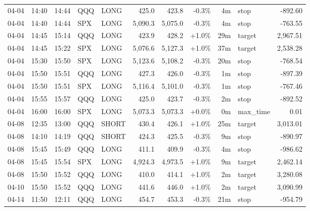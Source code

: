 \documentclass[11pt,a4paper,twoside]{article}
\begin{document}
\begin{center}
\begin{longtable}{>{\color{txtmain}}l l l l l r r r r >{\color{txtmain}}l r}
04-04 & 14:40 & 14:44 & QQQ & LONG & 425.0 & 423.8 & \textcolor{lossred}{-0.3\%} & 4m & stop & \textcolor{lossred}{-892.60} \\
04-04 & 14:40 & 14:44 & SPX & LONG & 5,090.3 & 5,075.0 & \textcolor{lossred}{-0.3\%} & 4m & stop & \textcolor{lossred}{-763.55} \\
04-04 & 14:45 & 15:14 & QQQ & LONG & 423.9 & 428.2 & \textcolor{wingreen}{+1.0\%} & 29m & target & \textcolor{wingreen}{2,967.51} \\
04-04 & 14:45 & 15:22 & SPX & LONG & 5,076.6 & 5,127.3 & \textcolor{wingreen}{+1.0\%} & 37m & target & \textcolor{wingreen}{2,538.28} \\
04-04 & 15:30 & 15:50 & SPX & LONG & 5,123.6 & 5,108.2 & \textcolor{lossred}{-0.3\%} & 20m & stop & \textcolor{lossred}{-768.54} \\
04-04 & 15:50 & 15:51 & QQQ & LONG & 427.3 & 426.0 & \textcolor{lossred}{-0.3\%} & 1m & stop & \textcolor{lossred}{-897.39} \\
04-04 & 15:50 & 15:51 & SPX & LONG & 5,116.4 & 5,101.0 & \textcolor{lossred}{-0.3\%} & 1m & stop & \textcolor{lossred}{-767.46} \\
04-04 & 15:55 & 15:57 & QQQ & LONG & 425.0 & 423.7 & \textcolor{lossred}{-0.3\%} & 2m & stop & \textcolor{lossred}{-892.52} \\
04-04 & 16:00 & 16:00 & SPX & LONG & 5,073.3 & 5,073.3 & \textcolor{wingreen}{+0.0\%} & 0m & max\_time & \textcolor{wingreen}{0.01} \\
04-08 & 12:35 & 13:00 & QQQ & SHORT & 430.4 & 426.1 & \textcolor{wingreen}{+1.0\%} & 25m & target & \textcolor{wingreen}{3,013.01} \\
04-08 & 14:10 & 14:19 & QQQ & SHORT & 424.3 & 425.5 & \textcolor{lossred}{-0.3\%} & 9m & stop & \textcolor{lossred}{-890.97} \\
04-08 & 15:45 & 15:49 & QQQ & LONG & 411.1 & 409.9 & \textcolor{lossred}{-0.3\%} & 4m & stop & \textcolor{lossred}{-986.62} \\
04-08 & 15:45 & 15:54 & SPX & LONG & 4,924.3 & 4,973.5 & \textcolor{wingreen}{+1.0\%} & 9m & target & \textcolor{wingreen}{2,462.14} \\
04-08 & 15:50 & 15:52 & QQQ & LONG & 410.0 & 414.1 & \textcolor{wingreen}{+1.0\%} & 2m & target & \textcolor{wingreen}{3,280.08} \\
04-10 & 15:50 & 15:52 & QQQ & LONG & 441.6 & 446.0 & \textcolor{wingreen}{+1.0\%} & 2m & target & \textcolor{wingreen}{3,090.99} \\
04-14 & 11:50 & 12:11 & QQQ & LONG & 454.7 & 453.3 & \textcolor{lossred}{-0.3\%} & 21m & stop & \textcolor{lossred}{-954.79} \\

\end{longtable}
\end{center}
\end{document}
